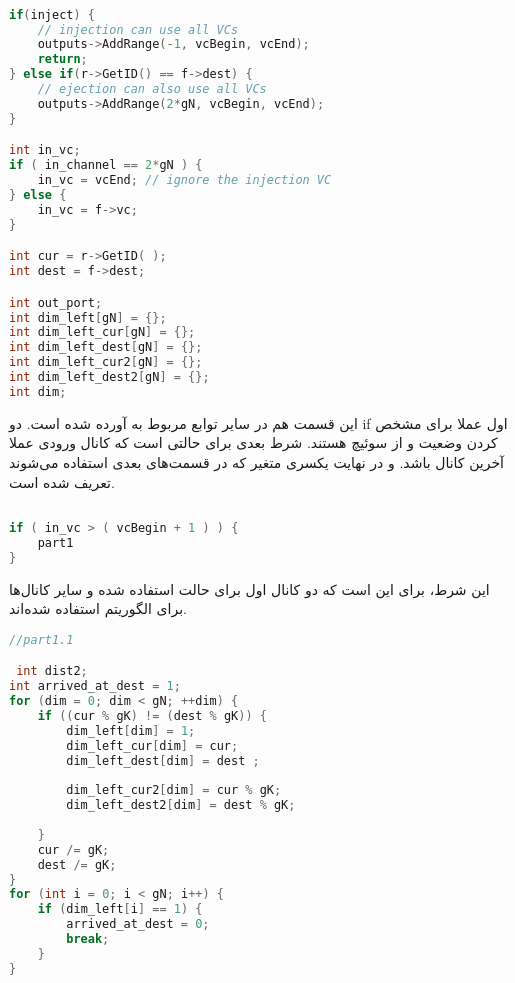 \begin{latin}
	\begin{lstlisting}[language = c++]

if(inject) {
	// injection can use all VCs
	outputs->AddRange(-1, vcBegin, vcEnd);
	return;
} else if(r->GetID() == f->dest) {
	// ejection can also use all VCs
	outputs->AddRange(2*gN, vcBegin, vcEnd);
}

int in_vc;
if ( in_channel == 2*gN ) {
	in_vc = vcEnd; // ignore the injection VC
} else {
	in_vc = f->vc;
}

int cur = r->GetID( );
int dest = f->dest;

int out_port;
int dim_left[gN] = {};
int dim_left_cur[gN] = {};
int dim_left_dest[gN] = {};
int dim_left_cur2[gN] = {};
int dim_left_dest2[gN] = {};
int dim;
		\end{lstlisting}
	\end{latin}

این قسمت هم در سایر توابع مربوط به  آورده شده است. دو if اول عملا برای مشخص کردن وضعیت  و  از سوئیچ هستند.  شرط بعدی برای حالتی است که کانال ورودی عملا آخرین کانال باشد. و در نهایت یکسری متغیر که در قسمت‌های بعدی استفاده می‌شوند تعریف شده است.


\begin{latin}
	\begin{lstlisting}[language = c++]
		
if ( in_vc > ( vcBegin + 1 ) ) {
	part1
}

	\end{lstlisting}
\end{latin}


این شرط، برای این است که دو کانال اول برای حالت
  استفاده شده و سایر کانال‌ها برای الگوریتم 
استفاده شده‌اند.



\begin{latin}
	\begin{lstlisting}[language = c++]
//part1.1

 int dist2;
int arrived_at_dest = 1;
for (dim = 0; dim < gN; ++dim) {
	if ((cur % gK) != (dest % gK)) {
		dim_left[dim] = 1;
		dim_left_cur[dim] = cur;
		dim_left_dest[dim] = dest ;
		
		dim_left_cur2[dim] = cur % gK;
		dim_left_dest2[dim] = dest % gK;
		
	}
	cur /= gK;
	dest /= gK;
}
for (int i = 0; i < gN; i++) {
	if (dim_left[i] == 1) {
		arrived_at_dest = 0;
		break;
	}
}
	\end{lstlisting}
\end{latin}



